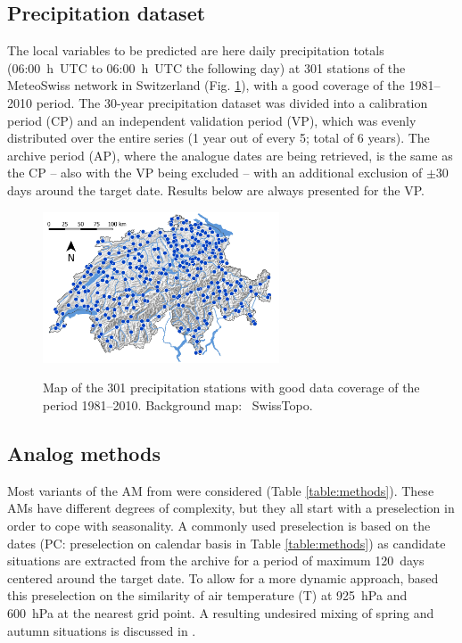 \documentclass[alpha-refs]{wiley-article}
\begin{document}

\subsection{Precipitation dataset}
\label{sec:precipitation}

The local variables to be predicted are here daily precipitation totals (06:00~h~UTC to 06:00~h~UTC the following day) at 301 stations of the MeteoSwiss network in Switzerland (Fig. \ref{fig:stations}), with a good coverage of the 1981--2010 period. The 30-year precipitation dataset was divided into a calibration period (CP) and an independent validation period (VP), which was evenly distributed over the entire series (1 year out of every 5; total of 6 years). The archive period (AP), where the analogue dates are being retrieved, is the same as the CP -- also with the VP being excluded -- with an additional exclusion of $\pm30$ days around the target date. Results below are always presented for the VP.

\begin{figure}
	\includegraphics[width=70mm]{figures/map-stations.jpg}\\
	\caption{Map of the 301 precipitation stations with good data coverage of the period 1981--2010. Background map: \textcopyright\ SwissTopo.}
	\label{fig:stations}
\end{figure}


\subsection{Analog methods}
\label{sec:ams}

Most variants of the AM from \cite{Horton2018b} were considered (Table \ref{table:methods}). These AMs have different degrees of complexity, but they all start with a preselection in order to cope with seasonality. A commonly used preselection is based on the dates (PC: preselection on calendar basis in Table \ref{table:methods}) as candidate situations are extracted from the archive for a period of maximum 120~days centered around the target date. To allow for a more dynamic approach, \citet{BenDaoud2016} based this preselection on the similarity of air temperature (T) at 925~hPa and 600~hPa at the nearest grid point. A resulting undesired mixing of spring and autumn situations is discussed in \citet{Caillouet2016}. 
\end{document}
